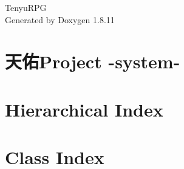 \documentclass[twoside]{book}
\newcommand{\+}{\discretionary{\mbox{\scriptsize$\hookleftarrow$}}{}{}}
\newcommand{\clearemptydoublepage}{%
  \newpage{\pagestyle{empty}\cleardoublepage}%
}
\begin{document}
\hypersetup{pageanchor=false,
             bookmarksnumbered=true,
             pdfencoding=unicode
            }
\begin{titlepage}
\vspace*{7cm}
\begin{center}%
{\Large Tenyu\+R\+PG }\\
\vspace*{1cm}
{\large Generated by Doxygen 1.8.11}\\
\end{center}
\end{titlepage}
\clearemptydoublepage
\tableofcontents
\clearemptydoublepage
{}
\hypersetup{pageanchor=true}

\chapter{天佑\+Project -\/system-\/}
\label{md_Classes_README}
\hypertarget{md_Classes_README}{}

\chapter{Hierarchical Index}

\chapter{Class Index}

\end{document}
